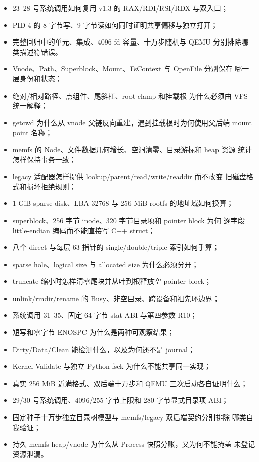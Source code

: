 \begin{itemize}
  \item 23--28 号系统调用如何复用 v1.3 的 RAX/RDI/RSI/RDX 与双入口；
  \item PID 4 的 8 字节写、9 字节读如何同时证明共享偏移与独立打开；
  \item 完整回归中的单元、集成、4096 fd 容量、十万步随机与 QEMU
        分别排除哪类描述符错误。
  \item Vnode、Path、Superblock、Mount、FsContext 与 OpenFile 分别保存
        哪一层身份和状态；
  \item 绝对/相对路径、点组件、尾斜杠、root clamp 和挂载根
         为什么必须由 VFS 统一解释；
  \item getcwd 为什么从 vnode 父链反向重建，遇到挂载根时为何使用父后端
        mount point 名称；
  \item memfs 的 Node、文件数据几何增长、空洞清零、目录游标和 heap 资源
        统计怎样保持事务一致；
  \item legacy 适配器怎样提供 lookup/parent/read/write/readdir 而不改变
        旧磁盘格式和损坏拒绝规则；
  \item 1 GiB sparse disk、LBA 32768 与 256 MiB rootfs 的地址域如何换算；
  \item superblock、256 字节 inode、320 字节目录项和 pointer block 为何
        逐字段 little-endian 编码而不能直接写 C++ struct；
  \item 八个 direct 与每层 63 指针的 single/double/triple 索引如何手算；
  \item sparse hole、logical size 与 allocated size 为什么必须分开；
  \item truncate 缩小时怎样清零尾块并从叶到根释放空 pointer block；
  \item unlink/rmdir/rename 的 Busy、非空目录、跨设备和祖先环边界；
  \item 系统调用 31--35、固定 64 字节 stat ABI 与第四参数 R10；
  \item 短写和零字节 ENOSPC 为什么是两种可观察结果；
  \item Dirty/Data/Clean 能检测什么，以及为何还不是 journal；
  \item Kernel Validate 与独立 Python fsck 为什么不能共享同一实现；
  \item 真实 256 MiB 近满格式、双后端十万步和 QEMU 三次启动各自证明什么；
  \item 29/30 号系统调用、4096/255 字节上限和 280 字节显式目录项 ABI；
  \item 固定种子十万步独立目录树模型与 memfs/legacy 双后端契约分别排除
        哪类自我验证；
  \item 持久 memfs heap/vnode 为什么从 Process 快照分账，又为何不能掩盖
        未登记资源泄漏。
\end{itemize}

